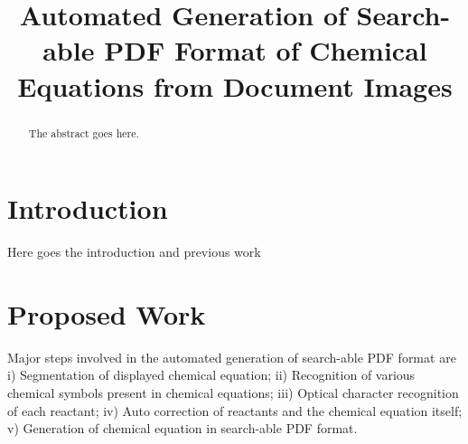\documentclass[conference]{IEEEtran}
\begin{document}
\title{Automated Generation of Search-able PDF Format of Chemical Equations from Document Images}


\author{
\and
{}
}


\maketitle


\begin{abstract}
The abstract goes here.
\end{abstract}


\section{Introduction}

Here goes the introduction and previous work


\section{Proposed Work}

Major steps involved in the automated generation of search-able PDF format are i) Segmentation of displayed chemical equation; ii) Recognition of various chemical symbols present in chemical equations; iii) Optical character recognition of each reactant; iv) Auto correction of reactants and the chemical equation itself; v) Generation of chemical equation in search-able PDF format.

%
%
\end{document}
